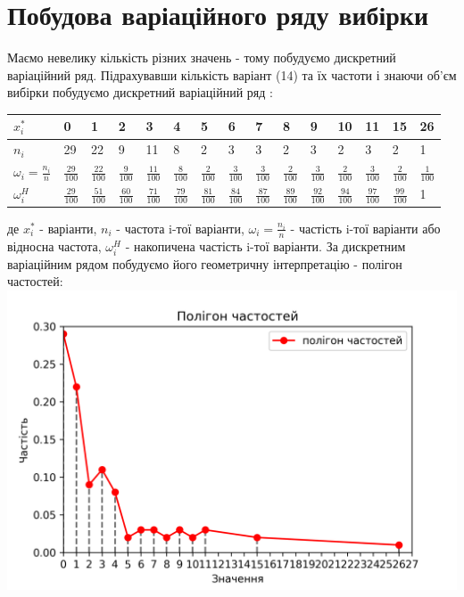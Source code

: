 \documentclass{article}
\begin{document}
\section{Побудова варіаційного ряду вибірки }
Маємо невелику кількість різних значень - тому побудуємо 
дискретний варіаційний ряд.
Підрахувавши кількість варіант (14) та їх частоти і знаючи 
об’єм вибірки побудуємо 
дискретний варіаційний ряд :
\newline
\newline
\begin{tabular}{|p{44pt}|p{13pt}|p{13pt}|p{13pt}|p{13pt}
  |p{13pt}|p{13pt}|p{13pt}|p{13pt}|p{13pt}|p{13pt}|p{13pt}
  |p{13pt}|p{13pt}|p{13pt}|}
  \hline
  $x_i^*$& 0 & 1 & 2 & 3 & 4 & 5 & 6 & 7 & 8 & 9 & 10 & 11 & 15 & 26\\
  \hline
  $n_i$& 29 & 22 & 9 & 11 & 8 & 2 & 3 & 3 & 2 & 3 & 2 & 3 & 2 & 1\\
  \hline
  $\omega_i = \frac{n_i}{n}$ & $\frac{29}{100}$ & 
  $\frac{22}{100}$ & $\frac{9}{100}$ & $\frac{11}{100}$ & 
  $\frac{8}{100}$ & $\frac{2}{100}$ & $\frac{3}{100}$ 
  & $\frac{3}{100}$ & $\frac{2}{100}$ & $\frac{3}{100}$ & 
  $\frac{2}{100}$ & $\frac{3}{100}$ & $\frac{2}{100}$ & 
  $\frac{1}{100}$\\
  \hline
  $\omega_i^H$&$\frac{29}{100}$&$\frac{51}{100}$&$\frac{60}{100}$&
  $\frac{71}{100}$&$\frac{79}{100}$&$\frac{81}{100}$&$\frac{84}{100}$&
  $\frac{87}{100}$&$\frac{89}{100}$&$\frac{92}{100}$&$\frac{94}{100}$&
  $\frac{97}{100}$&$\frac{99}{100}$&1\\
  \hline
\end{tabular}
\newline
\newline
де $x_i^*$ - варіанти, $n_i$ - частота i-тої 
варіанти, $\omega_i = \frac{n_i}{n}$ - частість i-тої варіанти або 
відносна частота, $\omega_i^H$ - накопичена частість i-тої варіанти.
\newline
За дискретним варіаційним рядом побудуємо його геометричну 
інтерпретацію - полігон частостей:
\newline
\includegraphics[scale = 0.9]{pol}
\end{document}
